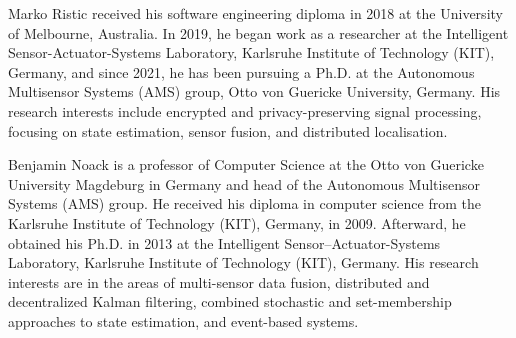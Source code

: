 \documentclass[10pt,letterpaper,oneside,twocolumn,journal]{IEEEtran}
\theoremstyle{definition}
\theoremstyle{definition}
\theoremstyle{remark}
\begin{document}
\ifCLASSOPTIONcaptionsoff
  \newpage
\fi





% 
%                                         
%                                         
%                                         
% 

\vspace{-1\baselineskip}
\begin{IEEEbiography}{Marko Ristic}
received his software engineering diploma in 2018 at the University of Melbourne, Australia. In 2019, he began work as a researcher at the Intelligent Sensor-Actuator-Systems Laboratory, Karlsruhe Institute of Technology (KIT), Germany, and since 2021, he has been pursuing a Ph.D. at the Autonomous Multisensor Systems (AMS) group, Otto von Guericke University, Germany. His research interests include encrypted and privacy-preserving signal processing, focusing on state estimation, sensor fusion, and distributed localisation.
\end{IEEEbiography}

\vspace{-1\baselineskip}
\begin{IEEEbiography}{Benjamin Noack}
is a professor of Computer Science at the Otto von Guericke University Magdeburg in Germany and head of the Autonomous Multisensor Systems (AMS) group. He received his diploma in computer science from the Karlsruhe Institute of Technology (KIT), Germany, in 2009. Afterward, he obtained his Ph.D. in 2013 at the Intelligent Sensor–Actuator-Systems Laboratory, Karlsruhe Institute of Technology (KIT), Germany. His research interests are in the areas of multi-sensor data fusion, distributed and decentralized Kalman filtering, combined stochastic and set-membership approaches to state estimation, and event-based systems.
\end{IEEEbiography}
\end{document}
